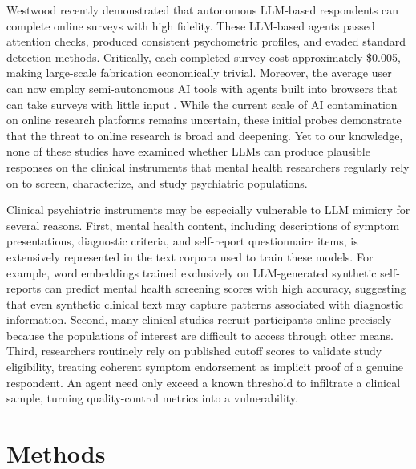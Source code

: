 \documentclass[12pt]{article}
\begin{document}
\vspace{0.5em}

Westwood recently demonstrated that autonomous LLM-based respondents can complete online surveys with high fidelity.\cite{westwood2025} These LLM-based agents passed attention checks, produced consistent psychometric profiles, and evaded standard detection methods. Critically, each completed survey cost approximately \$0.005, making large-scale fabrication economically trivial. Moreover, the average user can now employ semi-autonomous AI tools with agents built into browsers that can take surveys with little input \cite{ning_survey_2025}. While the current scale of AI contamination on online research platforms remains uncertain, these initial probes demonstrate that the threat to online research is broad and deepening.\cite{panizza_how_2026} Yet to our knowledge, none of these studies have examined whether LLMs can produce plausible responses on the clinical instruments that mental health researchers regularly rely on to screen, characterize, and study psychiatric populations.

\vspace{0.5em}

Clinical psychiatric instruments may be especially vulnerable to LLM mimicry for several reasons. First, mental health content, including descriptions of symptom presentations, diagnostic criteria, and self-report questionnaire items, is extensively represented in the text corpora used to train these models.\cite{Jin2025ApplicationsLLMsMentalHealth} For example, word embeddings trained exclusively on LLM-generated synthetic self-reports can predict mental health screening scores with high accuracy,\cite{moell2026} suggesting that even synthetic clinical text may capture patterns associated with diagnostic information. Second, many clinical studies recruit participants online precisely because the populations of interest are difficult to access through other means.\cite{chandler2016} Third, researchers routinely rely on published cutoff scores to validate study eligibility, treating coherent symptom endorsement as implicit proof of a genuine respondent. An agent need only exceed a known threshold to infiltrate a clinical sample, turning quality-control metrics into a vulnerability.

\section*{Methods}
\end{document}
